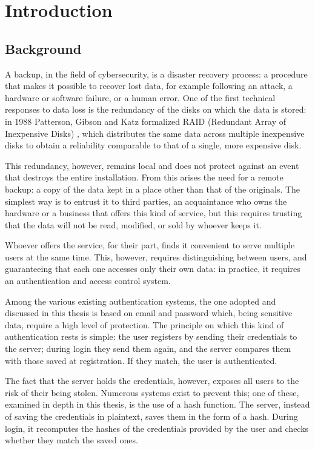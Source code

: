 \chapter{Introduction}
\label{chap:introduzione}

\section{Background}

A backup, in the field of cybersecurity, is a disaster recovery process: a procedure
that makes it possible to recover lost data, for example following an attack, a hardware or
software failure, or a human error. One of the first technical responses to data loss is the redundancy of the disks
on which the data is stored: in 1988 Patterson, Gibson and Katz formalized RAID (Redundant Array of
Inexpensive Disks) \cite{patterson-gibson-katz-raid-1988}, which distributes the same data across multiple
inexpensive disks to obtain a reliability comparable to that of a single, more expensive disk.

This redundancy, however, remains local and does not protect against an event that destroys the entire installation. From
this arises the need for a remote backup: a copy of the data kept in a place other than that
of the originals. The simplest way is to entrust it to third parties, an acquaintance who owns the hardware or
a business that offers this kind of service, but this requires trusting that the data
will not be read, modified, or sold by whoever keeps it.

Whoever offers the service, for their part, finds it convenient to serve multiple users at the same time. This,
however, requires distinguishing between users, and guaranteeing that each one accesses only their own data: in
practice, it requires an authentication and access control system.

Among the various existing authentication systems, the one adopted and discussed in this thesis is based on
email and password which, being sensitive data, require a high level of protection.
The principle on which this kind of authentication rests is simple:
the user registers by sending their credentials to the server; during login they send them again, and the
server compares them with those saved at registration. If they match, the user is authenticated.

The fact that the server holds the credentials, however, exposes all users to the risk of their being
stolen. Numerous systems exist to prevent this; one of these, examined in depth in this thesis, is the use of
a hash function.
The server, instead of saving the credentials in plaintext, saves them
in the form of a hash. During login, it recomputes the hashes of the credentials provided by the user and
checks whether they match the saved ones.

